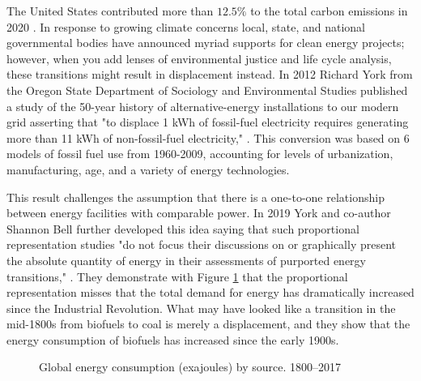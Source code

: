 The United States contributed more than $12.5\%$ to the total carbon emissions
in 2020 \cite{european_commission_joint_research_centre_ghg_2021}. In response
to growing climate concerns local, state, and national governmental bodies have
announced myriad supports for clean energy projects; however, when you add
lenses of environmental justice and life cycle analysis, these transitions might
result in displacement instead. In 2012 Richard York from the Oregon State
Department of Sociology and Environmental Studies published a study of the
50-year history of alternative-energy installations to our modern grid
asserting that "to displace 1 kWh of fossil-fuel electricity requires
generating more than 11 kWh of non-fossil-fuel electricity,"
\cite{york_alternative_2012}. This conversion was based on 6 models of fossil
fuel use from 1960-2009, accounting for levels of urbanization, manufacturing,
age, and a variety of energy technologies.

This result challenges the assumption that there is a one-to-one relationship
between energy facilities with comparable power. In 2019 York and co-author
Shannon Bell further developed this idea saying that such proportional
representation studies "do not focus their discussions on or graphically
present the absolute quantity of energy in their assessments of purported
energy transitions," \cite{york_energy_2019}. They demonstrate with Figure
\ref{fig:percent_total_energy} that the proportional representation misses that
the total demand for energy has dramatically increased since the Industrial
Revolution. What may have looked like a transition in the mid-1800s from
biofuels to coal is merely a displacement, and they show that the energy
consumption of biofuels has increased since the early 1900s.

\begin{figure}[H]
  \hfill
  \caption{
    Global energy consumption (exajoules) by source. 1800--2017
    \cite{york_energy_2019}}
  \label{fig:percent_total_energy}
\end{figure}

